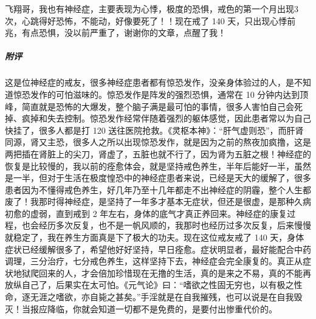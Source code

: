 \begin{case}
    飞翔哥，我也有神经症，主要表现为心悸，极度的恐惧，戒色的第一个月出现3次，心跳得好恐怖，不能动，好像要死了！！现在戒了 140 天，只出现心悸前兆，有点恐惧，没以前严重了，谢谢你的文章，点醒了我！
    \subparagraph{附评} 这是位神经症的戒友，很多神经症患者都有惊恐发作，没亲身体验过的人，是不知道惊恐发作的可怕滋味的。惊恐发作是阵发的强烈恐惧，通常在 10 分钟内达到顶峰，简直就是恐怖的大爆发，整个脑子满是最可怕的事情，很多人害怕自己会死掉、疯掉和失去控制。惊恐发作经常伴随着强烈的躯体感觉，因此患者常以为自己快挂了，很多人都是打 120 送往医院抢救。《灵枢本神》：“肝气虚则恐”，而肝肾同源，肾又主恐，很多人之所以出现惊恐发作，就是因为之前的熬夜加疯撸，这是两把插在肾脏上的尖刀，肾虚了，五脏也就不行了，因为肾为五脏之根！神经症的恢复是比较慢的，我以前的痊愈体会，就是坚持戒色养生，半年后能好一半，虽然是一半，但对于生活在极度惶恐中的神经症患者来说，已经是天大的缓解了，很多患者因为不懂得戒色养生，好几年乃至十几年都走不出神经症的阴霾，整个人生都废了！我那时得神经症，是坚持了一年多才基本无症状，但还是很虚，是那种久病初愈的虚弱，直到戒到 2 年左右，身体的底气才真正养回来。神经症的康复过程，也会经历多次反复，也不是一帆风顺的，我那时也经历过多次反复，后来慢慢就稳定了，我在养生方面真是下了极大的功夫。现在这位戒友戒了 140 天，身体症状已经缓解很多了，希望他好好坚持，早日痊愈。症状明显者，最好能配合中药调理，三分治疗，七分戒色养生，这样坚持下去，神经症会完全康复的。真正从症状地狱爬回来的人，才会倍加珍惜现在无撸的生活，真的是来之不易，真的不能再放纵自己了，后果实在太可怕。《元气论》曰：“嗜欲之性固无穷也，以有极之性命，逐无涯之嗜欲，亦自毙之甚矣。”手淫就是在自我摧残，也可以说是在自我毁灭！当报应降临，你就会知道一切都不是免费的，是要付出惨重代价的。
\end{case}

